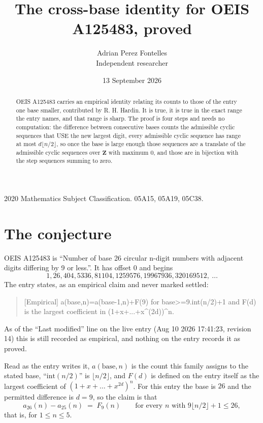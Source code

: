 \documentclass[11pt,a4paper]{article}
\title{The cross-base identity for OEIS A125483, proved}
\author{Adrian Perez Fontelles\\ \small Independent researcher}
\date{13 September 2026}
\theoremstyle{plain}
\theoremstyle{definition}
\begin{document}
\maketitle

\begin{abstract}
OEIS A125483 carries an empirical identity relating its counts to those of the entry one base
smaller, contributed by R. H. Hardin. It is true, it is true in the exact range the entry
names, and that range is sharp. The proof is four steps and needs no computation: the
difference between consecutive bases counts the admissible cyclic sequences that USE the new
largest digit, every admissible cyclic sequence has range at most $d\lfloor n/2\rfloor$, so
once the base is large enough those sequences are a translate of the admissible cyclic
sequences over $\mathbf{Z}$ with maximum $0$, and those are in bijection with the step
sequences summing to zero.
\end{abstract}

\noindent\small 2020 Mathematics Subject Classification. 05A15, 05A19, 05C38.\normalsize

\section{The conjecture}

OEIS A125483 is ``Number of base 26 circular n-digit numbers with adjacent digits differing by 9 or less.''. It has offset $0$ and begins
\[
1, 26, 404, 5336, 81104, 1259576, 19967936, 320169512,\ \dots
\]
The entry states, as an empirical claim and never marked settled:
\begin{quote}
[Empirical] a(base,n)=a(base-1,n)+F(9) for base>=9.int(n/2)+1 and F(d) is the largest coefficient in (1+x+...+x\textasciicircum{}(2d))\textasciicircum{}n.
\end{quote}
As of the ``Last modified'' line on the live entry (Aug 10 2026 17:41:23, revision 14)
this is still recorded as empirical, and nothing on the entry records it as proved.

Read as the entry writes it, $a(\mathrm{base},n)$ is the count this family assigns to the
stated base, ``$\mathrm{int}(n/2)$'' is $\lfloor n/2\rfloor$, and $F(d)$ is defined on the
entry itself as the largest coefficient of $(1+x+\dots+x^{2d})^{n}$. For this entry
the base is $26$ and the permitted difference is $d=9$, so the claim is that
\[
a_{26}(n)-a_{25}(n)\;=\;F_{9}(n)
\qquad\text{for every } n \text{ with } 9\lfloor n/2\rfloor+1\le26,
\]
that is, for $1\le n\le5$.
\end{document}
